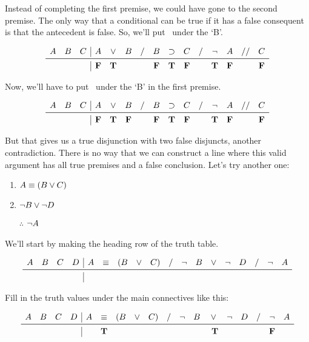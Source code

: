 \documentclass[../logic-text.tex]{subfiles}
\begin{document}
Instead of completing the first premise, we could have gone to the second premise. The only way that a conditional can be true if it has a false consequent is that the antecedent is false. So, we'll put \false\ under the \enquote*{B}.

\[
\begin{array}{ccc|cccccccccccc}
  A&B&C& A & \lor & B & / & B & \lif & C & / & \lneg & A & // & C \\ \midrule
  &&& \false & \true &&& \false & \true & \false && \true & \false && \false \\
\end{array}
\]

Now, we'll have to put \false\ under the \enquote*{B} in the first premise.

\[
\begin{array}{ccc|cccccccccccc}
  A&B&C& A & \lor & B & / & B & \lif & C & / & \lneg & A & // & C \\ \midrule
  &&& \false & \true & \false && \false & \true & \false && \true & \false && \false \\
\end{array}
\]

But that gives us a true disjunction with two false disjuncts, another contradiction. There is no way that we can construct a line where this valid argument has all true premises and a false conclusion.
Let's try another one:

\begin{enumerate}
	\item \(A \equiv (B \lor C)\)
	\item \underline{\(\neg B \lor \neg D\)}
	\item [$\therefore$] \(\neg A\)
\end{enumerate}

We'll start by making the heading row of the truth table.

\[
\begin{array}{cccc|cccccccccccccc}
  A&B&C&D& A &  \liff & (B & \lor & C) & / & \lneg & B & \lor & \lneg & D & / & \lneg & A \\ \midrule
  &&&&&&&&&&&&&&&&& \\
  \end{array}
\]

Fill in the truth values under the main connectives like this:

\[
\begin{array}{cccc|cccccccccccccc}
  A&B&C&D& A &  \liff & (B & \lor & C) & / & \lneg & B & \lor & \lneg & D & / & \lneg & A \\ \midrule
  &&&& & \true &&&&&&&\ \true &&&& \false & \\
  \end{array}
\]
\end{document}
